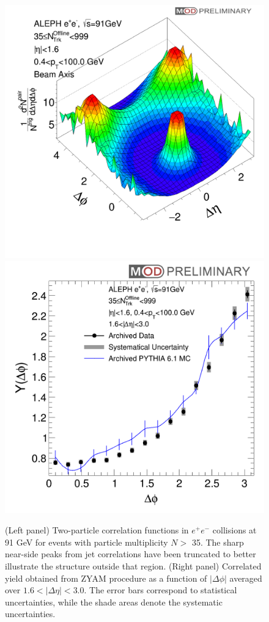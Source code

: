 \documentclass[aps,prl,twocolumn,showpacs,superscriptaddress,groupedaddress]{revtex4}  %
\begin{document}
\begin{figure}[!htb]
\begin{center}
\includegraphics[width=.29\textwidth]{plots/beam/beamAxisAnalysis.png}
\includegraphics[width=.29\textwidth]{plots/beam/beamAxisAnalysisProjection.png}
\caption{(Left panel) Two-particle correlation functions in $e^{+}e^{-}$ collisions at 91 GeV for events with particle multiplicity $N>$ 35. The sharp near-side peaks from jet correlations have been truncated to better illustrate the structure outside that region. (Right panel) Correlated yield obtained from ZYAM procedure as a function of $|\Delta\phi|$ averaged over $1.6<|\Delta\eta|<3.0$. The error bars correspond to statistical uncertainties, while the shade areas denote the systematic uncertainties.}
\label{fig:figure1} 
\end{center}
\end{figure}
\end{document}
